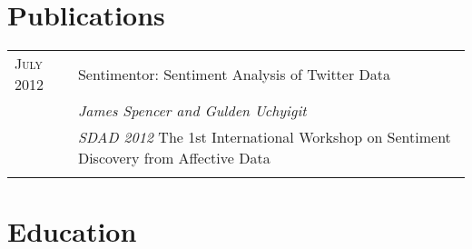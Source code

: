 \documentclass[a4paper,10pt]{article} %
\begin{document}
\section{Publications}

\begin{tabular}{ L{2cm} | L{11cm}}	
\textsc{July} 2012 & Sentimentor: Sentiment Analysis of Twitter Data\\
& \small\emph{James Spencer and Gulden Uchyigit} \\
& \small\emph{SDAD 2012  } The 1st International Workshop on Sentiment Discovery from Affective Data\\



&\\
\end{tabular}



\section{Education}
\end{document}
